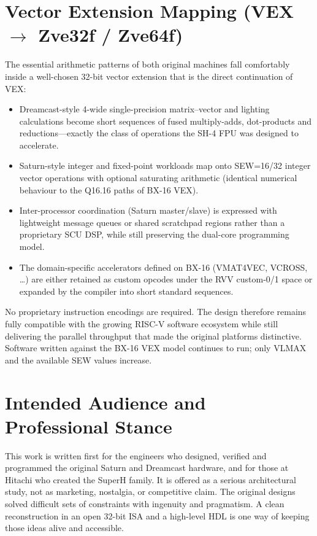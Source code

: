 \documentclass[11pt,a4paper]{article}
\begin{document}
\section{Vector Extension Mapping (VEX $\rightarrow$ Zve32f / Zve64f)}

The essential arithmetic patterns of both original machines fall comfortably inside a well-chosen 32-bit vector extension that is the direct continuation of VEX:

\begin{itemize}[leftmargin=1.5em]
  \item Dreamcast-style 4-wide single-precision matrix--vector and lighting calculations become short sequences of fused multiply-adds, dot-products and reductions---exactly the class of operations the SH-4 FPU was designed to accelerate.
  \item Saturn-style integer and fixed-point workloads map onto SEW=16/32 integer vector operations with optional saturating arithmetic (identical numerical behaviour to the Q16.16 paths of BX-16 VEX).
  \item Inter-processor coordination (Saturn master/slave) is expressed with lightweight message queues or shared scratchpad regions rather than a proprietary SCU DSP, while still preserving the dual-core programming model.
  \item The domain-specific accelerators defined on BX-16 (VMAT4VEC, VCROSS, \ldots) are either retained as custom opcodes under the RVV custom-0/1 space or expanded by the compiler into short standard sequences.
\end{itemize}

No proprietary instruction encodings are required. The design therefore remains fully compatible with the growing RISC-V software ecosystem while still delivering the parallel throughput that made the original platforms distinctive. Software written against the BX-16 VEX model continues to run; only VLMAX and the available SEW values increase.

\section{Intended Audience and Professional Stance}

This work is written first for the engineers who designed, verified and programmed the original Saturn and Dreamcast hardware, and for those at Hitachi who created the SuperH family. It is offered as a serious architectural study, not as marketing, nostalgia, or competitive claim. The original designs solved difficult sets of constraints with ingenuity and pragmatism. A clean reconstruction in an open 32-bit ISA and a high-level HDL is one way of keeping those ideas alive and accessible.
\end{document}
